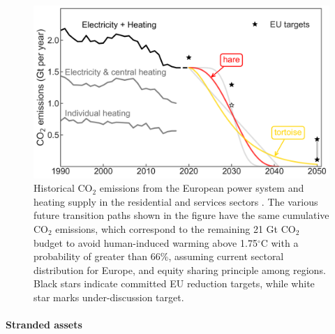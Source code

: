 \documentclass[5p]{elsarticle} %
\begin{document}
\begin{figure}[!h]
\centering
	\includegraphics[width=\columnwidth]{figures/carbon_budget.png}
\caption{Historical CO$_2$ emissions from the European power system and heating supply in the residential and services sectors \cite{UNFCCC_inventory}. The various future transition paths shown in the figure have the same cumulative CO$_2$ emissions, which correspond to the remaining 21 Gt CO$_2$ budget to avoid human-induced warming above 1.75$^{\circ}$C with a probability of greater than 66\%, assuming current sectoral distribution for Europe, and equity sharing principle among regions. Black stars indicate committed EU reduction targets, while white star marks under-discussion target.} \label{fig_carbon_budget} 
\end{figure}

\paragraph{\textbf{Stranded assets}} \
\end{document}
